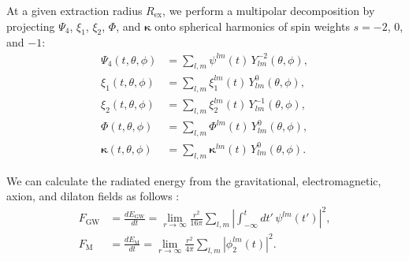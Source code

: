 At a given extraction radius $R_{\mathrm{ex}}$, we perform a multipolar decomposition by projecting $\Psi_4$, $\xi_1$, $\xi_2$, $\Phi$, and $\bm{\kappa}$ onto spherical harmonics of spin weights $s = -2$, $0$, and $-1$:
\begin{align}
\Psi_4(t,\theta,\phi) &= \sum_{l,m} \psi^{lm}(t)\, Y^{-2}_{lm}(\theta,\phi), \label{eq:psi4_decomp} \\
\xi_1(t,\theta,\phi) &= \sum_{l,m} \xi^{lm}_{1}(t)\, Y^{0}_{lm}(\theta,\phi), \label{eq:xi1_decomp} \\
\xi_2(t,\theta,\phi) &= \sum_{l,m} \xi^{lm}_{2}(t)\, Y^{-1}_{lm}(\theta,\phi), \label{eq:xi2_decomp} \\
\Phi(t,\theta,\phi) &= \sum_{l,m} \Phi^{lm}(t)\, Y^{0}_{lm}(\theta,\phi), \label{eq:phi_decomp} \\
\bm{\kappa}(t,\theta,\phi) &= \sum_{l,m} \bm{\kappa}^{lm}(t)\, Y^{0}_{lm}(\theta,\phi). \label{eq:kappa_decomp}
\end{align}

We can calculate the radiated energy from the gravitational, electromagnetic, axion, and dilaton fields as follows \cite{Zilhao2012}:
\begin{align}
F_{\mathrm{GW}}
&= \frac{dE_{\mathrm{GW}}}{dt}
= \lim_{r \to \infty} \frac{r^2}{16\pi}
\sum_{l,m} \left| \int_{-\infty}^{t} dt'\, \psi^{lm}(t') \right|^2, \\
F_{\mathrm{M}}
&= \frac{dE_{\mathrm{M}}}{dt}
= \lim_{r \to \infty} \frac{r^2}{4\pi}
\sum_{l,m} \left| \phi^{lm}_2(t) \right|^2.
\end{align}

